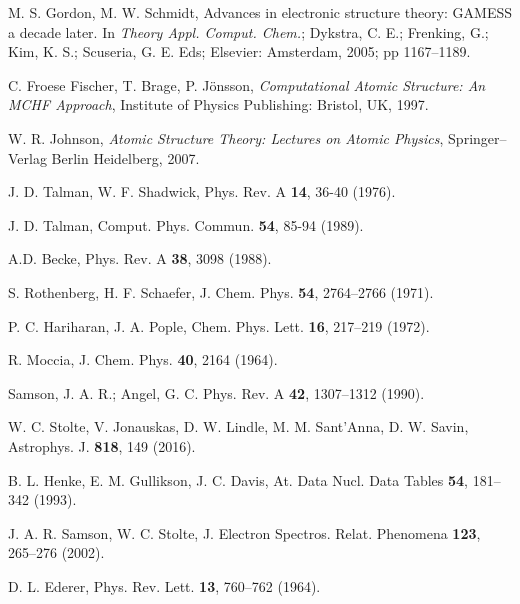 \begin{thebibliography}{9}
M. S. Gordon, M. W. Schmidt, 
Advances in electronic structure theory: GAMESS a decade later. 
In \textit{Theory Appl. Comput. Chem.}; 
Dykstra, C. E.; Frenking, G.; Kim, K. S.; Scuseria, G. E. Eds;
Elsevier: Amsterdam, 2005; pp 1167--1189.


C. Froese Fischer, T. Brage, P. J\"onsson,
\textit{Computational Atomic Structure: An MCHF Approach},
Institute of Physics Publishing: Bristol, UK, 1997.

W. R. Johnson, 
\textit{Atomic Structure Theory: Lectures on Atomic Physics},
Springer--Verlag Berlin Heidelberg, 2007.


J. D. Talman, W. F. Shadwick, 
Phys. Rev. A \textbf{14}, 36-40 (1976).

J. D. Talman, 
Comput. Phys. Commun. \textbf{54}, 85-94 (1989).


A.D. Becke, 
Phys. Rev. A \textbf{38}, 3098 (1988).


S. Rothenberg, H. F. Schaefer, 
J. Chem. Phys. \textbf{54}, 2764--2766 (1971).

P. C. Hariharan, J. A. Pople, 
Chem. Phys. Lett. \textbf{16}, 217--219 (1972).

R. Moccia, 
J. Chem. Phys. \textbf{40}, 2164 (1964).


Samson, J. A. R.; Angel, G. C.
Phys. Rev. A \textbf{42}, 1307--1312 (1990).

W. C. Stolte, V. Jonauskas, D. W. Lindle, M. M. Sant'Anna, D. W. Savin, 
Astrophys. J. \textbf{818}, 149 (2016).

B. L. Henke, E. M. Gullikson, J. C. Davis, 
At. Data Nucl. Data Tables \textbf{54}, 181--342 (1993).

J. A. R. Samson, W. C. Stolte, 
J. Electron Spectros. Relat. Phenomena \textbf{123}, 265--276 (2002).

D. L. Ederer, 
Phys. Rev. Lett. \textbf{13}, 760--762 (1964).


\end{thebibliography}
